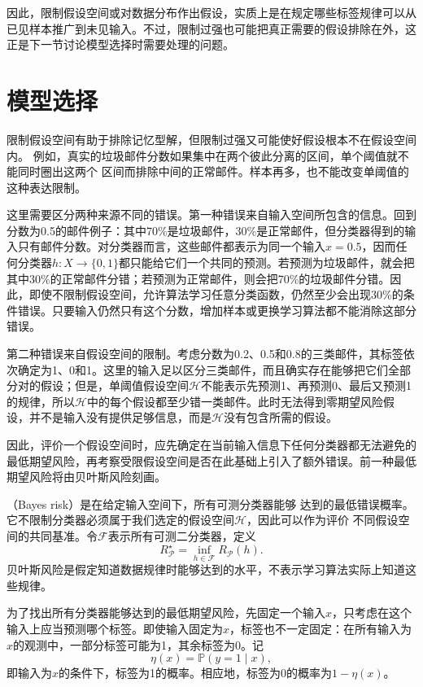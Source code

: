 因此，限制假设空间或对数据分布作出假设，实质上是在规定哪些标签规律可以从已见样本推广到未见输入。不过，限制过强也可能把真正需要的假设排除在外，这正是下一节讨论模型选择时需要处理的问题。

\section{模型选择}
\label{sec:statistical-model-selection}

限制假设空间有助于排除记忆型解，但限制过强又可能使好假设根本不在假设空间内。
例如，真实的垃圾邮件分数如果集中在两个彼此分离的区间，单个阈值就不能同时圈出这两个
区间而排除中间的正常邮件。样本再多，也不能改变单阈值的这种表达限制。

这里需要区分两种来源不同的错误。第一种错误来自输入空间所包含的信息。回到分数为0.5的邮件例子：其中70\%是垃圾邮件，30\%是正常邮件，但分类器得到的输入只有邮件分数。对分类器而言，这些邮件都表示为同一个输入$x=0.5$，因而任何分类器$h:X\to\{0,1\}$都只能给它们一个共同的预测。若预测为垃圾邮件，就会把其中30\%的正常邮件分错；若预测为正常邮件，则会把70\%的垃圾邮件分错。因此，即使不限制假设空间，允许算法学习任意分类函数，仍然至少会出现30\%的条件错误。只要输入仍然只有这个分数，增加样本或更换学习算法都不能消除这部分错误。

第二种错误来自假设空间的限制。考虑分数为0.2、0.5和0.8的三类邮件，其标签依次确定为1、0和1。这里的输入足以区分三类邮件，而且确实存在能够把它们全部分对的假设；但是，单阈值假设空间$\mathcal H$不能表示先预测1、再预测0、最后又预测1的规律，所以$\mathcal H$中的每个假设都至少错一类邮件。此时无法得到零期望风险假设，并不是输入没有提供足够信息，而是$\mathcal H$没有包含所需的假设。

因此，评价一个假设空间时，应先确定在当前输入信息下任何分类器都无法避免的最低期望风险，再考察受限假设空间是否在此基础上引入了额外错误。前一种最低期望风险将由贝叶斯风险刻画。

（Bayes risk）是在给定输入空间下，所有可测分类器能够
达到的最低错误概率。它不限制分类器必须属于我们选定的假设空间$\mathcal H$，因此可以作为评价
不同假设空间的共同基准。令$\mathcal F$表示所有可测二分类器，定义
\begin{equation}
 R_{\mathcal P}^\star=\inf_{h\in\mathcal F}R_{\mathcal P}(h).
 \label{eq:bayes-risk}
\end{equation}
贝叶斯风险是假定知道数据规律时能够达到的水平，不表示学习算法实际上知道这些规律。

为了找出所有分类器能够达到的最低期望风险，先固定一个输入$x$，只考虑在这个输入上应当预测哪个标签。即使输入固定为$x$，标签也不一定固定：在所有输入为$x$的观测中，一部分标签可能为1，其余标签为0。记
\[
 \eta(x)=\mathbb P(y=1\mid x),
\]
即输入为$x$的条件下，标签为1的概率。相应地，标签为0的概率为$1-\eta(x)$。

